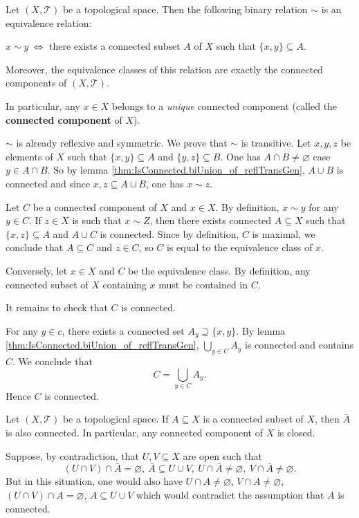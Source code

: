 \begin{propositionenv}
    Let $(X,\mathscr{T})$ be a topological space.
    Then the following binary relation $\sim$ is an equivalence relation:
    \begin{center}
        $x \sim y \ \Leftrightarrow$ there exists a connected subset $A$ of $X$ such that $\{x,y\} \subseteq A$. 
    \end{center}
    Moreover, the equivalence classes of this relation are exactly the connected components of $(X,\mathscr{T})$.
    
    \quad In particular, any $x \in X$ belongs to a \textit{unique} connected component (called the \textbf{connected component} of $X$).
\end{propositionenv}
\begin{proofenv}
    $\sim$ is already reflexive and symmetric.
    We prove that $\sim$ is transitive.
    Let $x,y, z$ be elements of $X$ such that $\{x,y\}\subseteq A$ and $\{y,z\} \subseteq B$.
    One has $A \cap B \neq \varnothing$ case $y \in A \cap B$.
    So by lemma \ref{thm:IsConnected.biUnion_of_reflTransGen}, $A \cup B$ is connected and since ${x,z} \subseteq A \cup B$, one has $x \sim z$.

    \quad Let $C$ be a connected component of $X$ and $x \in X$.
    By definition, $x\sim y$ for any $y \in C$.
    If $z \in X$ is such that $x \sim Z$, then there exists connected $A \subseteq X$ such that $\{x,z\} \subseteq A$ and $A \cup C$ is connected.
    Since by definition, $C$ is maximal, we conclude that $A \subseteq C$ and $z \in C$, so $C$ is equal to the equivalence class of $x$.

    \quad Conversely, let $x \in X$ and $C$ be the equivalence class.
    By definition, any connected subset of $X$ containing $x$ must be contained in $C$.
    
    \quad It remains to check that $C$ is connected.
    
    \quad For any $y \in c$, there exists a connected set $A_y \supseteq \{x,y\}$.
    By lemma \ref{thm:IsConnected.biUnion_of_reflTransGen}, $\displaystyle \bigcup_{y \in C} A_y$ is connected and contains $C$.
    We conclude that
    $$C = \bigcup_{y \in C} A_y.$$
    Hence $C$ is connected.
\end{proofenv}

\begin{propositionenv}\label{prop:5.1.15}
    Let $(X,\mathscr{T})$ be a topological space.
    If $A \subseteq X$ is a connected subset of $X$, then $\bar{A}$ is also connected.
    In particular, any connected component of $X$ is closed.
\end{propositionenv}
\begin{proofenv}
    Suppose, by contradiction, that $U,V \subseteq X$ are open such that
    $$ (U \cap V) \cap \bar{A} = \varnothing,\ \bar{A} \subseteq U \cup V,\ U \cap \bar{A} \neq \varnothing,\ V \cap \bar{A} \neq \varnothing.$$
    But in this situation, one would also have $U \cap A \neq \varnothing$, $V \cap A \neq \varnothing$, $(U \cap V) \cap A =\varnothing$, $A \subseteq U \cup V$ which would contradict the assumption that $A$ is connected.
\end{proofenv}


